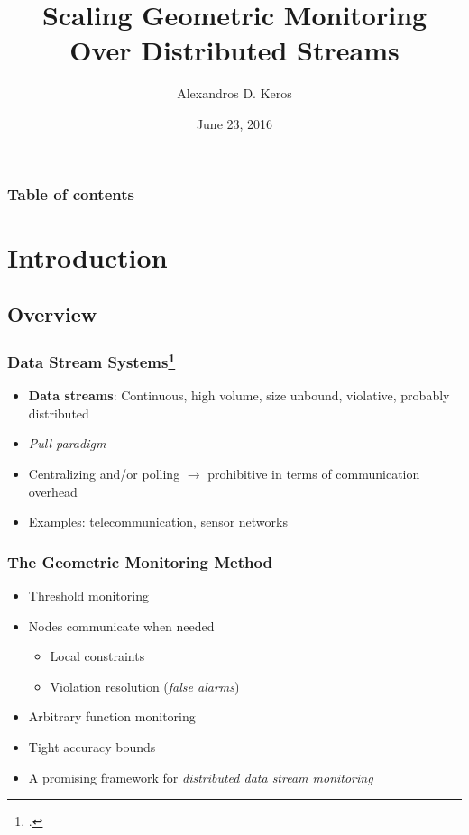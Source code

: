 \documentclass[hyperref={pdfpagelabels=false}]{beamer}
\title{Scaling Geometric Monitoring Over Distributed Streams}
\author{Alexandros D. Keros}
\date{June 23, 2016}
\begin{document}
\begin{frame}
\titlepage
\end{frame} 


\begin{frame}
\frametitle{Table of contents}
\tableofcontents
\end{frame} 

\section{Introduction}
\begin{frame}
  \tableofcontents[currentsection]
 \end{frame}
 
\subsection*{Overview}
\begin{frame} \frametitle{Data Stream Systems\footcite{Babcock2002DataStreamSystems}}
\begin{itemize}
\item \textbf{Data streams}: Continuous, high volume, size unbound, violative, probably distributed
\item \emph{Pull paradigm}
\item Centralizing and/or polling $\rightarrow$ prohibitive in terms of communication overhead
\item Examples: telecommunication, sensor networks 
\end{itemize}
\end{frame}

\begin{frame} \frametitle{The Geometric Monitoring Method}
\begin{itemize}
\item Threshold monitoring
\item Nodes communicate when needed
	\begin{itemize}
	\item Local constraints
	\item Violation resolution (\emph{false alarms})
	\end{itemize}
\item Arbitrary function monitoring
\item Tight accuracy bounds
\item A promising framework for \emph{distributed data stream monitoring}
\end{itemize}
\end{frame}
\end{document}
